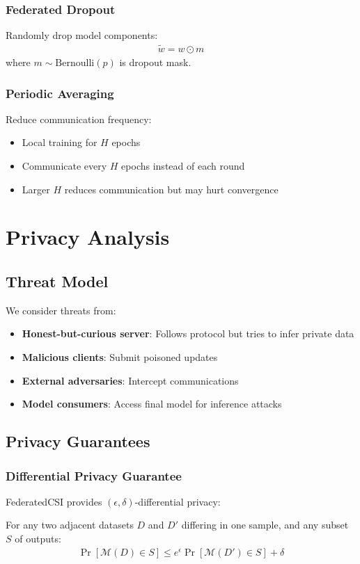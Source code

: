 \documentclass[journal]{IEEEtran}
\begin{document}
\subsubsection{Federated Dropout}
Randomly drop model components:
\begin{align}
\tilde{w} = w \odot m
\end{align}
where $m \sim \text{Bernoulli}(p)$ is dropout mask.

\subsubsection{Periodic Averaging}
Reduce communication frequency:
\begin{itemize}
\item Local training for $H$ epochs
\item Communicate every $H$ epochs instead of each round
\item Larger $H$ reduces communication but may hurt convergence
\end{itemize}

\section{Privacy Analysis}

\subsection{Threat Model}

We consider threats from:
\begin{itemize}
\item \textbf{Honest-but-curious server}: Follows protocol but tries to infer private data
\item \textbf{Malicious clients}: Submit poisoned updates
\item \textbf{External adversaries}: Intercept communications
\item \textbf{Model consumers}: Access final model for inference attacks
\end{itemize}

\subsection{Privacy Guarantees}

\subsubsection{Differential Privacy Guarantee}
FederatedCSI provides $(\epsilon, \delta)$-differential privacy:
\begin{theorem}
For any two adjacent datasets $D$ and $D'$ differing in one sample, and any subset $S$ of outputs:
\begin{align}
\Pr[\mathcal{M}(D) \in S] \leq e^\epsilon \Pr[\mathcal{M}(D') \in S] + \delta
\end{align}
\end{theorem}
\end{document}
